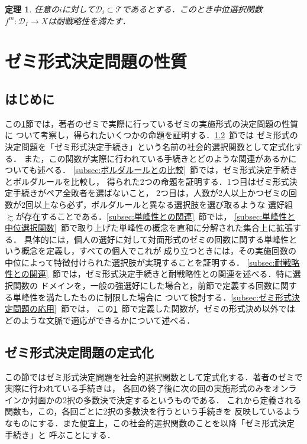 \documentclass[dvipdfmx]{jsarticle}
\newtheorem{theorem}[definition]{定理}
\begin{document}
\begin{theorem}
  任意の$i$に対して$\mathcal{D}_i \subset \mathcal{T}$であるとする．このとき中位選択関数
  $f^m\colon \mathcal{D}_I \to X$は耐戦略性を満たす．
\end{theorem}

\newpage
\section{ゼミ形式決定問題の性質}\label{sec:ゼミ形式決定問題の性質}
\subsection{はじめに}
この\ref{sec:ゼミ形式決定問題の性質}節では，著者のゼミで実際に行っているゼミの実施形式の決定問題の性質に
ついて考察し，得られたいくつかの命題を証明する．\ref{subsec:ゼミ形式決定問題の定式化}~節では
ゼミ形式の決定問題を「ゼミ形式決定手続き」という名前の社会的選択関数として定式化する．
また，この関数が実際に行われている手続きとどのような関連があるかについても述べる．
\ref{subsec:ボルダルールとの比較}~節では，ゼミ形式決定手続きとボルダルールを比較し，
得られた2つの命題を証明する．1つ目はゼミ形式決定手続きがペア全敗者を選ばないこと，
2つ目は，人数が2人以上かつゼミの回数が2回以上なら必ず，ボルダルールと異なる選択肢を選び取るような
選好組$\succsim$が存在することである．\ref{subsec:単峰性との関連}~節では，
\ref{subsec:単峰性と中位選択関数}~節で取り上げた単峰性の概念を直和に分解された集合上に拡張する．
具体的には，個人の選好に対して対面形式のゼミの回数に関する単峰性という概念を定義し，すべての個人でこれが
成り立つときには，その実施回数の中位によって特徴付けられた選択肢が実現することを証明する．
\ref{subsec:耐戦略性との関連}~節では，ゼミ形式決定手続きと耐戦略性との関連を述べる．特に選択関数の
ドメインを，一般の強選好にした場合と，前節で定義する回数に関する単峰性を満たしたものに制限した場合に
ついて検討する．\ref{subsec:ゼミ形式決定問題の応用}~節では，
この\ref{sec:ゼミ形式決定問題の性質}~節で定義した関数が，ゼミの形式決め以外では
どのような文脈で適応ができるかについて述べる．


\subsection{ゼミ形式決定問題の定式化}\label{subsec:ゼミ形式決定問題の定式化}
この節ではゼミ形式決定問題を社会的選択関数として定式化する．著者のゼミで実際に行われている手続きは，
各回の終了後に次の回の実施形式のみをオンラインか対面かの2択の多数決で決定するというものである．
これから定義される関数も，この，各回ごとに2択の多数決を行うという手続きを
反映しているようなものにする．また便宜上，この社会的選択関数のことを以降「ゼミ形式決定手続き」と
呼ぶことにする．
\end{document}
